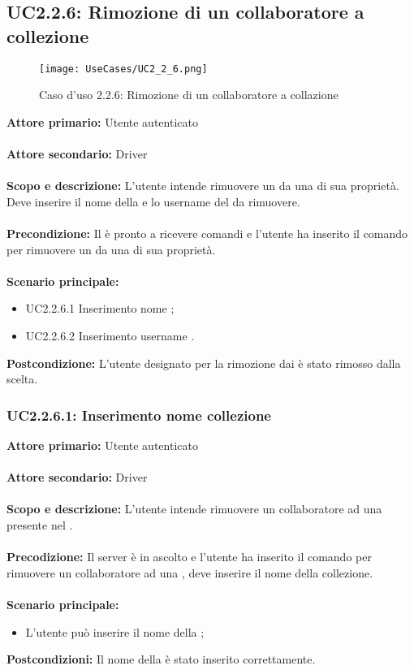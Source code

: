 \documentclass{scalatekids-article}
\begin{document}
\subsection{UC2.2.6: Rimozione di un collaboratore a collezione}
\begin{figure}[H]
  \begin{center}
    \texttt{[image: UseCases/UC2\_2\_6.png]}
    \caption*{Caso d'uso 2.2.6: Rimozione di un collaboratore a collazione}
  \end{center}
\end{figure}
\textbf{Attore primario:} Utente autenticato\\ \\
\textbf{Attore secondario:} Driver\\ \\
\textbf{Scopo e descrizione:} L'utente intende rimuovere un  da una  di sua proprietà. Deve inserire il nome della  e lo username del  da rimuovere.\\ \\
\textbf{Precondizione:} Il  è pronto a ricevere comandi e l'utente ha inserito il comando per rimuovere un  da una  di sua proprietà.\\ \\
\textbf{Scenario principale:}
\begin{itemize}
\item UC2.2.6.1 Inserimento nome ;
\item UC2.2.6.2 Inserimento username .
\end{itemize}
\textbf{Postcondizione:} L'utente designato per la rimozione dai  è stato rimosso dalla  scelta.

\subsubsection{UC2.2.6.1: Inserimento nome collezione}

\textbf{Attore primario:} Utente autenticato\\ \\
\textbf{Attore secondario:} Driver\\ \\
\textbf{Scopo e descrizione:} L’utente intende rimuovere un collaboratore ad una  presente nel .\\ \\
\textbf{Precodizione:} Il server è in ascolto e l’utente ha inserito il comando per rimuovere un collaboratore ad una , deve inserire il nome della collezione.\\ \\
\textbf{Scenario principale:}
\begin{itemize}
\item L'utente può inserire il nome della ;
\end{itemize}
\textbf{Postcondizioni:} Il nome della  è stato inserito correttamente.
\end{document}
